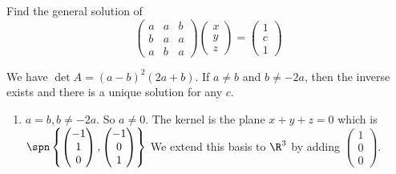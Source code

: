 \documentclass[a4paper]{article}
\begin{document}
\begin{eg}
  Find the general solution of
  \[
  \begin{pmatrix}
    a & a & b\\
    b & a & a\\
    a & b & a
  \end{pmatrix}
  \begin{pmatrix}
    x\\y\\z
  \end{pmatrix}
  =\begin{pmatrix}
   1\\c\\1
  \end{pmatrix}
  \]

  We have $\det A = (a - b)^2 (2a + b)$. If $a \not= b$ and $b \not= -2a$, then the inverse exists and there is a unique solution for any $c$.
  \begin{enumerate}
  \item $a = b, b \not= -2a$. So $a\not= 0$. The kernel is the plane $x + y + z = 0$ which is $\spn\left\{
    \begin{pmatrix}
      -1\\1\\0
    \end{pmatrix},
    \begin{pmatrix}
      -1\\ 0\\ 1
    \end{pmatrix}\right\}$
    We extend this basis to $\R^3$ by adding $
    \begin{pmatrix}
      1\\0\\0
    \end{pmatrix}$.


\end{enumerate}
\end{eg}
\end{document}
